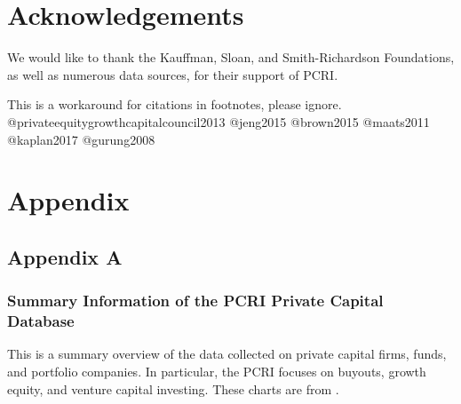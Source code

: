 \documentclass[
]{book}
\begin{document}
\hypertarget{acknowledgements-1}{%
\section*{Acknowledgements}\label{acknowledgements-1}}

We would like to thank the Kauffman, Sloan, and Smith-Richardson Foundations, as well as numerous data sources, for their support of PCRI.

\begin{invisible}
This is a workaround for citations in footnotes, please ignore.
@privateequitygrowthcapitalcouncil2013 @jeng2015 @brown2015 @maats2011
@kaplan2017 @gurung2008
\end{invisible}

\hypertarget{appendix-3}{%
\section*{Appendix}\label{appendix-3}}

\hypertarget{appendix-a-1}{%
\subsection*{Appendix A}\label{appendix-a-1}}

\hypertarget{summary-information-of-the-pcri-private-capital-database}{%
\subsubsection*{Summary Information of the PCRI Private Capital Database}\label{summary-information-of-the-pcri-private-capital-database}}

This is a summary overview of the data collected on private capital firms, funds, and portfolio companies. In particular, the PCRI focuses on buyouts, growth equity, and venture capital investing. These charts are from \citep{jeng2015}.
\end{document}
